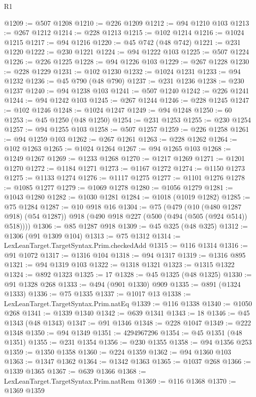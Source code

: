 \begin{lexlean}{R1}
\begin{coremodule}
@1209 := @507 @1208
@1210 := @226 @1209
@1212 := @94 @1210 @103
@1213 := @267 @1212
@1214 := @228 @1213
@1215 := @102 @1214
@1216 := @1024 @1215
@1217 := @94 @1216
@1220 := @45 @742 (@48 @742)
@1221 := @231 @1220
@1222 := @230 @1221
@1224 := @94 @1222 @103
@1225 := @507 @1224
@1226 := @226 @1225
@1228 := @94 @1226 @103
@1229 := @267 @1228
@1230 := @228 @1229
@1231 := @102 @1230
@1232 := @1024 @1231
@1233 := @94 @1232
@1236 := @45 @790 (@48 @790)
@1237 := @231 @1236
@1238 := @230 @1237
@1240 := @94 @1238 @103
@1241 := @507 @1240
@1242 := @226 @1241
@1244 := @94 @1242 @103
@1245 := @267 @1244
@1246 := @228 @1245
@1247 := @102 @1246
@1248 := @1024 @1247
@1249 := @94 @1248
@1250 := 60
@1253 := @45 @1250 (@48 @1250)
@1254 := @231 @1253
@1255 := @230 @1254
@1257 := @94 @1255 @103
@1258 := @507 @1257
@1259 := @226 @1258
@1261 := @94 @1259 @103
@1262 := @267 @1261
@1263 := @228 @1262
@1264 := @102 @1263
@1265 := @1024 @1264
@1267 := @94 @1265 @103
@1268 := @1249 @1267
@1269 := @1233 @1268
@1270 := @1217 @1269
@1271 := @1201 @1270
@1272 := @1184 @1271
@1273 := @1167 @1272
@1274 := @1150 @1273
@1275 := @1133 @1274
@1276 := @1117 @1275
@1277 := @1101 @1276
@1278 := @1085 @1277
@1279 := @1069 @1278
@1280 := @1056 @1279
@1281 := @1043 @1280
@1282 := @1030 @1281
@1284 := @1018 (@1019 @1282)
@1285 := @75 @1284
@1287 := @10 @918 @16
@1304 := @75
    (@479
      (@10 (@480 @1287 @918) (@54 @1287))
      @918
      (@490 @918 @227 (@500 (@494 (@505 (@924 @514)) @518))))
@1306 := @85 @1287 @918
@1309 := @45 @325 (@48 @325)
@1312 := @1306 (@91 @1309 @104)
@1313 := @75 @1312
@1314 := LexLeanTarget.TargetSyntax.Prim.checkedAdd
@1315 := @116 @1314
@1316 := @91 @1072
@1317 := @1316 @104
@1318 := @94 @1317
@1319 := @1316 @895
@1321 := @94 @1319 @103
@1322 := @1318 @1321
@1323 := @1315 @1322
@1324 := @892 @1323
@1325 := 17
@1328 := @45 @1325 (@48 @1325)
@1330 := @91 @1328 @268
@1333 := @494 (@901 @1330) @909
@1335 := @891 (@1324 @1333)
@1336 := @75 @1335
@1337 := @1017 @13
@1338 := LexLeanTarget.TargetSyntax.Prim.natEq
@1339 := @116 @1338
@1340 := @1050 @268
@1341 := @1339 @1340
@1342 := @639 @1341
@1343 := 18
@1346 := @45 @1343 (@48 @1343)
@1347 := @91 @1346
@1348 := @228 @1047
@1349 := @222 @1348
@1350 := @94 @1349
@1351 := 4294967296
@1354 := @45 @1351 (@48 @1351)
@1355 := @231 @1354
@1356 := @230 @1355
@1358 := @94 @1356 @253
@1359 := @1350 @1358
@1360 := @224 @1359
@1362 := @94 @1360 @103
@1363 := @1347 @1362
@1364 := @1342 @1363
@1365 := @1037 @268
@1366 := @1339 @1365
@1367 := @639 @1366
@1368 := LexLeanTarget.TargetSyntax.Prim.natRem
@1369 := @116 @1368
@1370 := @1369 @1359

\end{coremodule}
\end{lexlean}
